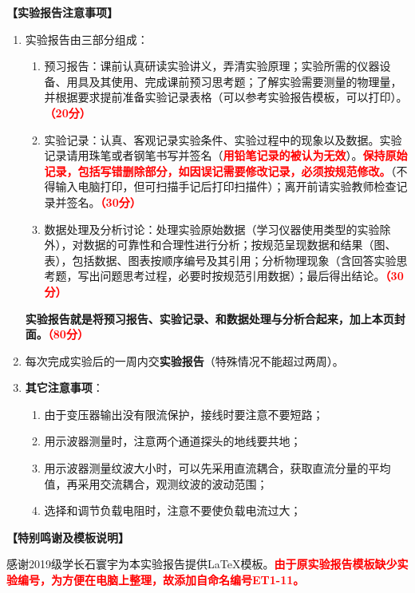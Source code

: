 \documentclass[dvipsnames, svgnames,a4paper,11pt]{article}
\begin{document}
	\textbf{【实验报告注意事项】}
	\begin{enumerate}
		\item 实验报告由三部分组成：
		\begin{enumerate}
			\item 预习报告：课前认真研读实验讲义，弄清实验原理；实验所需的仪器设备、用具及其使用、完成课前预习思考题；了解实验需要测量的物理量，并根据要求提前准备实验记录表格（可以参考实验报告模板，可以打印）。\textcolor{red}{\textbf{（20分）}}
			\item 实验记录：认真、客观记录实验条件、实验过程中的现象以及数据。实验记录请用珠笔或者钢笔书写并签名（\textcolor{red}{\textbf{用铅笔记录的被认为无效}}）。\textcolor{red}{\textbf{保持原始记录，包括写错删除部分，如因误记需要修改记录，必须按规范修改。}}（不得输入电脑打印，但可扫描手记后打印扫描件）；离开前请实验教师检查记录并签名。\textcolor{red}{\textbf{（30分）}}
			\item 数据处理及分析讨论：处理实验原始数据（学习仪器使用类型的实验除外），对数据的可靠性和合理性进行分析；按规范呈现数据和结果（图、表），包括数据、图表按顺序编号及其引用；分析物理现象（含回答实验思考题，写出问题思考过程，必要时按规范引用数据）；最后得出结论。\textcolor{red}{\textbf{（30分）}}
		\end{enumerate}
		\textbf{实验报告就是将预习报告、实验记录、和数据处理与分析合起来，加上本页封面。\textcolor{red}{（80分）}}
		\item 每次完成实验后的一周内交\textbf{实验报告}（特殊情况不能超过两周）。
		\item \textbf{其它注意事项}：
		\begin{enumerate}
			\item 由于变压器输出没有限流保护，接线时要注意不要短路；
			\item 用示波器测量时，注意两个通道探头的地线要共地；
			\item 用示波器测量纹波大小时，可以先采用直流耦合，获取直流分量的平均值，再采用交流耦合，观测纹波的波动范围；
			\item 选择和调节负载电阻时，注意不要使负载电流过大；
		\end{enumerate}
	\end{enumerate}
	
	
	
	
	\textbf{【特别鸣谢及模板说明】}	
	
	感谢2019级学长石寰宇为本实验报告提供\LaTeX 模板。\textcolor{red}{\textbf{由于原实验报告模板缺少实验编号，为方便在电脑上整理，故添加自命名编号ET1-11。}}
	
\end{document}
